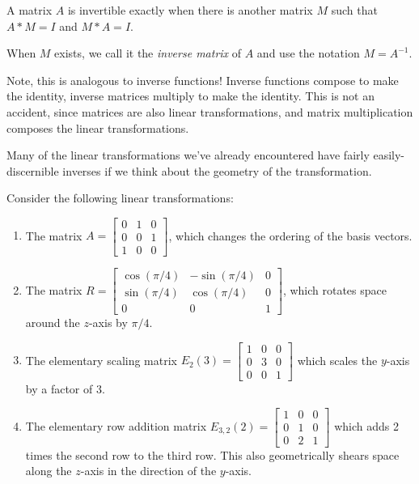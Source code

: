 \documentclass{ximera}
\begin{document}
\begin{definition}
  A matrix $A$ is invertible exactly when there is another matrix $M$ such that $A*M=I$ and $M*A=I$.

  When $M$ exists, we call it the \emph{inverse matrix} of $A$ and use the notation $M=A^{-1}$.
\end{definition}

\begin{remark}
  Note, this is analogous to inverse functions! Inverse functions compose to make the identity, inverse matrices multiply to make the identity. This is not an accident, since matrices are also linear transformations, and matrix multiplication composes the linear transformations.
\end{remark}

\begin{exploration}
  Many of the linear transformations we've already encountered have fairly easily-discernible inverses if we think about the geometry of the transformation.

  Consider the following linear transformations:

  \begin{enumerate}
    \item The matrix $A=\begin{bmatrix}
      0&1&0\\0&0&1\\1&0&0
    \end{bmatrix}$, which changes the ordering of the basis vectors.
    \item The matrix $R=\begin{bmatrix}
      \cos(\pi/4) & -\sin(\pi/4) & 0\\
      \sin(\pi/4) & \cos(\pi/4) & 0\\
      0&0&1
    \end{bmatrix}$, which rotates space around the $z$-axis by $\pi/4$.
    \item The elementary scaling matrix $E_{2}(3)=\begin{bmatrix}
      1 & 0 & 0 \\
      0 & 3 & 0 \\
      0 & 0 & 1
    \end{bmatrix}$ which scales the $y$-axis by a factor of $3$.
    \item The elementary row addition matrix $E_{3,2}(2)=\begin{bmatrix}
      1 & 0 & 0 \\
      0 & 1 & 0 \\
      0 & 2 & 1
    \end{bmatrix}$ which adds 2 times the second row to the third row. This also geometrically shears space along the $z$-axis in the direction of the $y$-axis.
  \end{enumerate}


\end{exploration}
\end{document}
